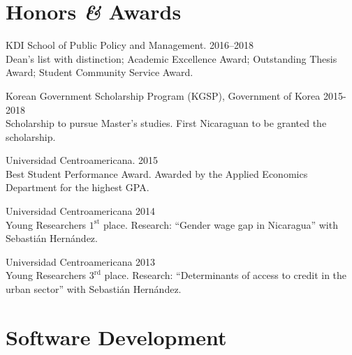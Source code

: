 \documentclass[a4paper, 10pt]{article}
\renewenvironment{itemize}{
  \begin{list}{}
    { \setlength{\itemsep}{5pt}
      \setlength{\parsep}{0pt}
      \setlength{\topsep}{0pt}
      \setlength{\leftmargin}{0em} } }{
  \end{list}}
\begin{document}

\section*{Honors \textit{\&} Awards}
\begin{itemize}
\item KDI School of Public Policy and Management. \hfill 2016--2018 \\ {\small Dean's list with distinction; Academic Excellence Award; Outstanding Thesis Award; Student Community Service Award.}
\item Korean Government Scholarship Program (KGSP), Government of Korea \hfill 2015-2018 \\ {\small Scholarship to pursue Master's studies. First Nicaraguan to be granted the scholarship.}
\item Universidad Centroamericana. \hfill 2015 \\ {\small  Best Student Performance Award. Awarded by the Applied Economics Department for the highest GPA.}
\item Universidad Centroamericana \hfill 2014 \\ {\small Young Researchers $1^{\textrm{st}}$ place. Research: ``Gender wage gap in Nicaragua'' with Sebastián Hernández.}
\item Universidad Centroamericana \hfill 2013 \\ {\small Young Researchers $3^{\textrm{rd}}$ place. Research: ``Determinants of access to credit in the urban sector'' with Sebastián Hernández. }
\end{itemize}


\section*{Software Development}
\end{document}
